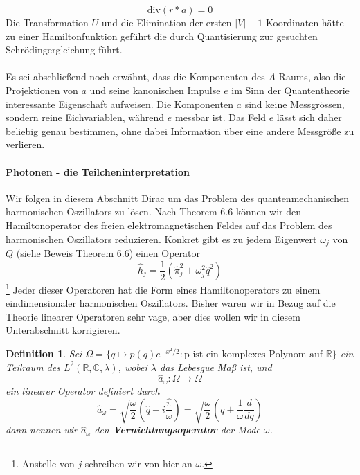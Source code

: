\documentclass[11pt,a4paper,leqno]{report}
\newtheorem{definition}[theorem]{Definition}
\numberwithin{equation}{chapter}
\begin{document}
 \begin{equation}
	\text{div}(r * a) = 0
\end{equation}
Die Transformation $U$ und die Elimination der ersten $|V| - 1$ Koordinaten h\"atte zu einer Hamiltonfunktion gef\"uhrt die durch Quantisierung zur gesuchten Schr\"odingergleichung f\"uhrt.\\
\\
Es sei abschlie\ss{}end noch erw\"ahnt, dass die Komponenten des $A$ Raums, also die Projektionen von $a$ und seine kanonischen Impulse $e$ im Sinn der Quantentheorie interessante Eigenschaft aufweisen. Die Komponenten $a$ sind keine Messgr\"oss{}en, sondern reine Eichvariablen, w\"ahrend $e$ messbar ist. Das Feld $e$ l\"asst sich daher beliebig genau bestimmen, ohne dabei Information \"uber eine andere Messgr\"o\ss{}e zu verlieren.
\paragraph{Photonen - die Teilcheninterpretation}
Wir folgen in diesem Abschnitt Dirac um das Problem des quantenmechanischen harmonischen Oszillators zu l\"osen. Nach Theorem 6.6 k\"onnen wir den Hamiltonoperator des freien elektromagnetischen Feldes auf das Problem des harmonischen Oszillators reduzieren. Konkret gibt es zu jedem Eigenwert $\omega_j$ von $Q$ (siehe Beweis Theorem 6.6) einen Operator
\begin{equation*}
	\hat{h}_j = \frac{1}{2}(\hat{\pi}_j^2 + \omega_j^2 \hat{q}^2)
\end{equation*}\footnote{Anstelle von $j$ schreiben wir von hier an $\omega$.}
Jeder dieser Operatoren hat die Form eines Hamiltonoperators zu einem eindimensionaler harmonischen Oszillators. Bisher waren wir in Bezug auf die Theorie linearer Operatoren sehr vage, aber dies wollen wir in diesem Unterabschnitt korrigieren.
\begin{definition}
	Sei $\Omega=\{q\mapsto p(q)e^{-x^2 / 2}: \text{p ist ein komplexes Polynom auf $\mathbb{R}$}\}$ ein Teilraum des $L^2(\mathbb{R}, \mathbb{C},\lambda)$, wobei $\lambda$ das Lebesgue Ma\ss{} ist, und 
	\begin{equation}
		\hat{a}_\omega: \Omega \mapsto \Omega
	\end{equation}
ein linearer Operator definiert durch 
\begin{equation}
	\hat{a}_\omega = \sqrt{\frac{\omega}{2}}(\hat{q} + i \frac{\hat{\pi}}{\omega}) = \sqrt{\frac{\omega}{2}}(q +  \frac{1}{\omega}\frac{d}{dq})
\end{equation}
dann nennen wir $\hat{a}_\omega$ den \textbf{Vernichtungsoperator} der Mode $\omega$.
\end{definition}
\end{document}
